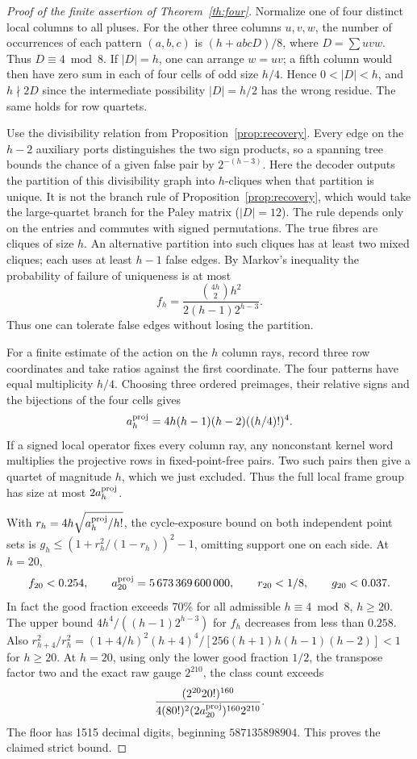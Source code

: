 \documentclass[11pt,reqno]{amsart}
\theoremstyle{remark}\newtheorem{remark}[theorem]{Remark}
\begin{document}
\begin{proof}[Proof of the finite assertion of Theorem~\ref{th:four}]
Normalize one of four distinct local columns to all pluses. For the other three columns \(u,v,w\), the number of occurrences of each pattern \((a,b,c)\) is \((h+abcD)/8\), where \(D=\sum uvw\). Thus \(D\equiv4\bmod8\). If \(|D|=h\), one can arrange \(w=uv\); a fifth column would then have zero sum in each of four cells of odd size \(h/4\). Hence \(0<|D|<h\), and \(h\nmid 2D\) since the intermediate possibility \(|D|=h/2\) has the wrong residue. The same holds for row quartets.

Use the divisibility relation from Proposition~\ref{prop:recovery}. Every edge on the \(h-2\) auxiliary ports distinguishes the two sign products, so a spanning tree bounds the chance of a given false pair by \(2^{-(h-3)}\). Here the decoder outputs the partition of this divisibility graph into \(h\)-cliques when that partition is unique. It is not the branch rule of Proposition~\ref{prop:recovery}, which would take the large-quartet branch for the Paley matrix (\(|D|=12\)). The rule depends only on the entries and commutes with signed permutations. The true fibres are cliques of size \(h\). An alternative partition into such cliques has at least two mixed cliques; each uses at least \(h-1\) false edges. By Markov's inequality the probability of failure of uniqueness is at most
\[
 f_h=\frac{\binom{4h}{2}h^2}{2(h-1)2^{h-3}} .
\]
Thus one can tolerate false edges without losing the partition.

For a finite estimate of the action on the \(h\) column rays, record three row coordinates and take ratios against the first coordinate. The four patterns have equal multiplicity \(h/4\). Choosing three ordered preimages, their relative signs and the bijections of the four cells gives
\[
 a_h^{\rm proj}=4h(h-1)(h-2)((h/4)!)^4 .
\]
If a signed local operator fixes every column ray, any nonconstant kernel word multiplies the projective rows in fixed-point-free pairs. Two such pairs then give a quartet of magnitude \(h\), which we just excluded. Thus the full local frame group has size at most \(2a_h^{\rm proj}\).

With \(r_h=4h\sqrt{a_h^{\rm proj}/h!}\), the cycle-exposure bound on both independent point sets is \(g_h\le(1+r_h^2/(1-r_h))^2-1\), omitting support one on each side. At \(h=20\),
\[
 f_{20}<0.254,\qquad
 a_{20}^{\rm proj}=5\,673\,369\,600\,000,\qquad r_{20}<1/8,\qquad g_{20}<0.037 .
\]
In fact the good fraction exceeds \(70\%\) for all admissible \(h\equiv4\bmod8\), \(h\ge20\). The upper bound \(4h^4/((h-1)2^{h-3})\) for \(f_h\) decreases from less than \(0.258\). Also \(r_{h+4}^2/r_h^2=(1+4/h)^2(h+4)^4/[256(h+1)h(h-1)(h-2)]<1\) for \(h\ge20\). At \(h=20\), using only the lower good fraction \(1/2\), the transpose factor two and the exact raw gauge \(2^{210}\), the class count exceeds
\[
 \frac{(2^{20}20!)^{160}}{4(80!)^2(2a_{20}^{\rm proj})^{160}2^{210}}.
\]
The floor has 1515 decimal digits, beginning \(587135898904\). This proves the claimed strict bound.
\end{proof}
\end{document}
